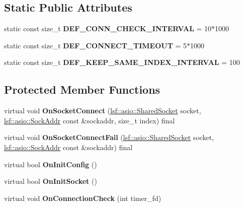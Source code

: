 \subsection*{Static Public Attributes}
\begin{DoxyCompactItemize}
\item 
\hypertarget{classBasicConnectService_ac0a7aa6bcf05444e565935b9305e5b8e}{
static const size\_\-t {\bfseries DEF\_\-CONN\_\-CHECK\_\-INTERVAL} = 10$\ast$1000}
\label{classBasicConnectService_ac0a7aa6bcf05444e565935b9305e5b8e}

\item 
\hypertarget{classBasicConnectService_afb1fdce1fb5d26a01113440ce0658eff}{
static const size\_\-t {\bfseries DEF\_\-CONNECT\_\-TIMEOUT} = 5$\ast$1000}
\label{classBasicConnectService_afb1fdce1fb5d26a01113440ce0658eff}

\item 
\hypertarget{classBasicConnectService_a76c17579a55a0acfd9b25976f480eb25}{
static const size\_\-t {\bfseries DEF\_\-KEEP\_\-SAME\_\-INDEX\_\-INTERVAL} = 100}
\label{classBasicConnectService_a76c17579a55a0acfd9b25976f480eb25}

\end{DoxyCompactItemize}
\subsection*{Protected Member Functions}
\begin{DoxyCompactItemize}
\item 
\hypertarget{classBasicConnectService_a5243e80ff729b2c2a233b0bf66bf264d}{
virtual void {\bfseries OnSocketConnect} (\hyperlink{classlsf_1_1asio_1_1SharedSocket}{lsf::asio::SharedSocket} socket, \hyperlink{classlsf_1_1asio_1_1SockAddr}{lsf::asio::SockAddr} const \&sockaddr, size\_\-t index) final}
\label{classBasicConnectService_a5243e80ff729b2c2a233b0bf66bf264d}

\item 
\hypertarget{classBasicConnectService_ad719f65a46c7cb2607e384c378c073de}{
virtual void {\bfseries OnSocketConnectFail} (\hyperlink{classlsf_1_1asio_1_1SharedSocket}{lsf::asio::SharedSocket} socket, \hyperlink{classlsf_1_1asio_1_1SockAddr}{lsf::asio::SockAddr} const \&sockaddr) final}
\label{classBasicConnectService_ad719f65a46c7cb2607e384c378c073de}

\item 
\hypertarget{classBasicConnectService_aebe0b4384f99c43d24df11752dcf018c}{
virtual bool {\bfseries OnInitConfig} ()}
\label{classBasicConnectService_aebe0b4384f99c43d24df11752dcf018c}

\item 
\hypertarget{classBasicConnectService_ac6a650a3f695d1dcef75f25f4bc8c309}{
virtual bool {\bfseries OnInitSocket} ()}
\label{classBasicConnectService_ac6a650a3f695d1dcef75f25f4bc8c309}

\item 
\hypertarget{classBasicConnectService_a0cb8789e9fe5d74e2ecd6a7050ebeed3}{
virtual void {\bfseries OnConnectionCheck} (int timer\_\-fd)}
\label{classBasicConnectService_a0cb8789e9fe5d74e2ecd6a7050ebeed3}

\end{DoxyCompactItemize}
